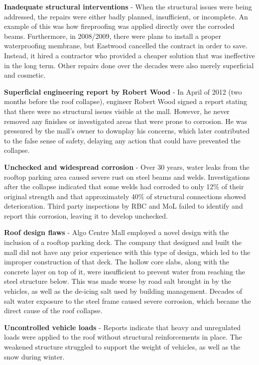 \documentclass[12pt]{article}
\begin{document}
\textbf{Inadequate structural interventions} - When the structural issues were being addressed, the repairs were either badly planned, insufficient, or incomplete. An example of this was how fireproofing was applied directly over the corroded beams. Furthermore, in 2008/2009, there were plans to install a proper waterproofing membrane, but Eastwood cancelled the contract in order to save. Instead, it hired a contractor who provided a cheaper solution that was ineffective in the long term. Other repairs done over the decades were also merely superficial and cosmetic.

\textbf{Superficial engineering report by Robert Wood} - In April of 2012 (two months before the roof collapse), engineer Robert Wood signed a report stating that there were no structural issues visible at the mall. However, he never removed any finishes or investigated areas that were prone to corrosion. He was pressured by the mall's owner to downplay his concerns, which later contributed to the false sense of safety, delaying any action that could have prevented the collapse.

\textbf{Unchecked and widespread corrosion} - Over 30 years, water leaks from the rooftop parking area caused severe rust on steel beams and welds. Investigations after the collapse indicated that some welds had corroded to only 12\% of their original strength and that approximately 40\% of structural connections showed deterioration. Third party inspections by RBC and MoL failed to identify and report this corrosion, leaving it to develop unchecked. 

\textbf{Roof design flaws} - Algo Centre Mall employed a novel design with the inclusion of a rooftop parking deck. The company that designed and built the mall did not have any prior experience with this type of design, which led to the improper construction of that deck. The hollow core slabs, along with the concrete layer on top of it, were insufficient to prevent water from reaching the steel structure below. This was made worse by road salt brought in by the vehicles, as well as the de-icing salt used by building management. Decades of salt water exposure to the steel frame caused severe corrosion, which became the direct cause of the roof collapse. 

\textbf{Uncontrolled vehicle loads} - Reports indicate that heavy and unregulated loads were applied to the roof without structural reinforcements in place. The weakened structure struggled to support the weight of vehicles, as well as the snow during winter. 
\end{document}
